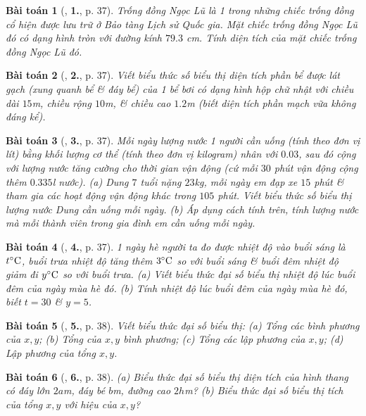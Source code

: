 \documentclass{article}
\numberwithin{equation}{section}
\newtheorem{baitoan}{Bài toán}
\begin{document}
\begin{baitoan}[\cite{SBT_Toan_7_Canh_Dieu_tap_2}, \textbf{1.}, p. 37]
	Trống đồng Ngọc Lũ là 1 trong những chiếc trống đồng cổ hiện được lưu trữ ở Bảo tàng Lịch sử Quốc gia. Mặt chiếc trống đồng Ngọc Lũ đó có dạng hình tròn với đường kính $79.3$ \emph{cm}. Tính diện tích của mặt chiếc trống đồng Ngọc Lũ đó.
\end{baitoan}

\begin{baitoan}[\cite{SBT_Toan_7_Canh_Dieu_tap_2}, \textbf{2.}, p. 37]
	Viết biểu thức số biểu thị diện tích phần bể được lát gạch (xung quanh bể \& đáy bể) của 1 bể bơi có dạng hình hộp chữ nhật với chiều dài $15$\emph{m}, chiều rộng $10$\emph{m}, \& chiều cao $1.2$\emph{m} (biết diện tích phần mạch vữa không đáng kể).
\end{baitoan}

\begin{baitoan}[\cite{SBT_Toan_7_Canh_Dieu_tap_2}, \textbf{3.}, p. 37]
	Mỗi ngày lượng nước 1 người cần uống (tính theo đơn vị lít) bằng khối lượng cơ thể (tính theo đơn vị kilogram) nhân với $0.03$, sau đó cộng với lượng nước tăng cường cho thời gian vận động (cứ mỗi $30$ phút vận động cộng thêm $0.335$\emph{l} nước). (a) Dung $7$ tuổi nặng $23$\emph{kg}, mỗi ngày em đạp xe $15$ phút \& tham gia các hoạt động vận động khác trong $105$ phút. Viết biểu thức số biểu thị lượng nước Dung cần uống mỗi ngày. (b) Áp dụng cách tính trên, tính lượng nước mà mỗi thành viên trong gia đình em cần uống mỗi ngày.
\end{baitoan}

\begin{baitoan}[\cite{SBT_Toan_7_Canh_Dieu_tap_2}, \textbf{4.}, p. 37]
	1 ngày hè người ta đo được nhiệt độ vào buổi sáng là $t^\circ{\rm C}$, buổi trưa nhiệt độ tăng thêm $3^\circ{\rm C}$ so với buổi sáng \& buổi đêm nhiệt độ giảm đi $y^\circ{\rm C}$ so với buổi trưa. (a) Viết biểu thức đại số biểu thị nhiệt độ lúc buổi đêm của ngày mùa hè đó. (b) Tính nhiệt độ lúc buổi đêm của ngày mùa hè đó, biết $t = 30$ \& $y = 5$.
\end{baitoan}

\begin{baitoan}[\cite{SBT_Toan_7_Canh_Dieu_tap_2}, \textbf{5.}, p. 38]
	Viết biểu thức đại số biểu thị: (a) Tổng các bình phương của $x,y$; (b) Tổng của $x,y$ bình phương; (c) Tổng các lập phương của $x,y$; (d) Lập phương của tổng $x,y$.
\end{baitoan}

\begin{baitoan}[\cite{SBT_Toan_7_Canh_Dieu_tap_2}, \textbf{6.}, p. 38]
	(a) Biểu thức đại số biểu thị diện tích của hình thang có đáy lớn $2a$\emph{m}, đáy bé $b$\emph{m}, đường cao $2h$\emph{m}? (b) Biểu thức đại số biểu thị tích của tổng $x,y$ với hiệu của $x,y$?
\end{baitoan}
\end{document}
